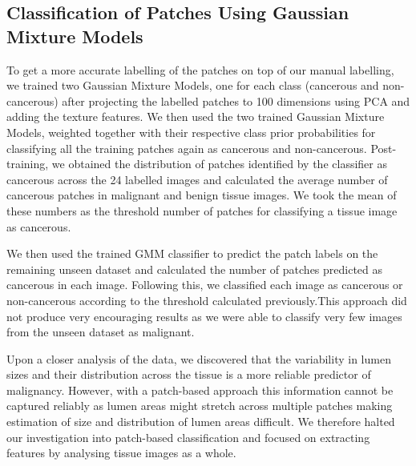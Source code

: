 \subsection{Classification of Patches Using Gaussian Mixture Models}
To get a more accurate labelling of the patches on top of our manual labelling, we trained two Gaussian Mixture Models, one for each class (cancerous and non-cancerous) after projecting the labelled patches to 100 dimensions using PCA and adding the texture features. We then used the two trained Gaussian Mixture Models, weighted together with their respective class prior probabilities for classifying all the training patches again as cancerous and non-cancerous. Post-training, we obtained the distribution of patches identified by the classifier as cancerous across the 24 labelled images and calculated the average number of cancerous patches in malignant and benign tissue images. We took the mean of these numbers as the threshold number of patches for classifying a tissue image as cancerous.

We then used the trained GMM classifier to predict the patch labels on the remaining unseen dataset and calculated the number of patches predicted as cancerous in each image. Following this, we classified each image as cancerous or non-cancerous according to the threshold calculated previously.This approach did not produce very encouraging results as we were able to classify very few images from the unseen dataset as malignant.

Upon a closer analysis of the data, we discovered that the variability in lumen sizes and their distribution across the tissue is a more reliable predictor of malignancy. However, with a patch-based approach this information cannot be captured reliably as lumen areas might stretch across multiple patches making estimation of size and distribution of lumen areas difficult. We therefore halted our investigation into patch-based classification and focused on extracting features by analysing tissue images as a whole.



 

